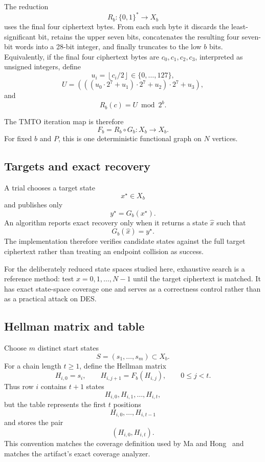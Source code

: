 The reduction
\[
    R_b:\{0,1\}^{*}\longrightarrow X_b
\]
uses the final four ciphertext bytes.  From each such byte it discards the
least-significant bit, retains the upper seven bits, concatenates the resulting
four seven-bit words into a 28-bit integer, and finally truncates to the low
$b$ bits.  Equivalently, if the final four ciphertext bytes are
$c_0,c_1,c_2,c_3$, interpreted as unsigned integers, define
\[
    u_i=\left\lfloor c_i/2\right\rfloor\in\{0,\ldots,127\},
\]
\[
    U =
       (((u_0\cdot 2^7+u_1)\cdot 2^7+u_2)\cdot 2^7+u_3),
\]
and
\[
    R_b(c)=U\bmod 2^b.
\]

The TMTO iteration map is therefore
\begin{equation}
    F_b = R_b\circ G_b:X_b\longrightarrow X_b.
    \label{eq:iteration-map}
\end{equation}
For fixed $b$ and $P$, this is one deterministic functional graph on $N$
vertices.

\subsection{Targets and exact recovery}

A trial chooses a target state
\[
    x^\star\in X_b
\]
and publishes only
\[
    y^\star = G_b(x^\star).
\]
An algorithm reports exact recovery only when it returns a state $\hat x$ such
that
\[
    G_b(\hat x)=y^\star.
\]
The implementation therefore verifies candidate states against the full target
ciphertext rather than treating an endpoint collision as success.

For the deliberately reduced state spaces studied here, exhaustive search is a
reference method: test $x=0,1,\ldots,N-1$ until the target ciphertext is
matched.  It has exact state-space coverage one and serves as a correctness
control rather than as a practical attack on DES.

\subsection{Hellman matrix and table}

Choose $m$ distinct start states
\[
    S=(s_1,\ldots,s_m)\subset X_b.
\]
For a chain length $t\geq 1$, define the Hellman matrix
\[
    H_{i,0}=s_i,
    \qquad
    H_{i,j+1}=F_b(H_{i,j}),
    \qquad
    0\leq j<t.
\]
Thus row $i$ contains $t+1$ states
\[
    H_{i,0},H_{i,1},\ldots,H_{i,t},
\]
but the table represents the first $t$ positions
\[
    H_{i,0},\ldots,H_{i,t-1}
\]
and stores the pair
\[
    (H_{i,0},H_{i,t}).
\]
This convention matches the coverage definition used by Ma and
Hong~\cite{MaHong2009} and matches the artifact's exact coverage analyzer.

